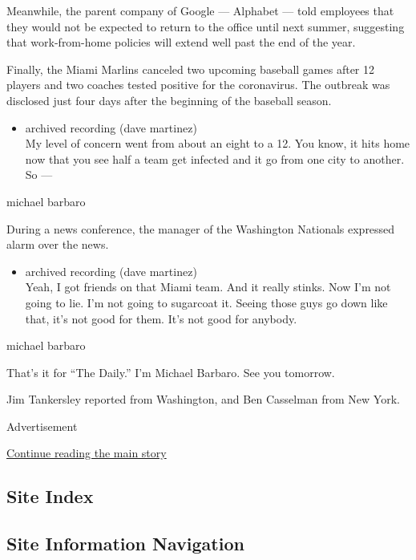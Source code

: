 Meanwhile, the parent company of Google --- Alphabet --- told employees
that they would not be expected to return to the office until next
summer, suggesting that work-from-home policies will extend well past
the end of the year.

Finally, the Miami Marlins canceled two upcoming baseball games after 12
players and two coaches tested positive for the coronavirus. The
outbreak was disclosed just four days after the beginning of the
baseball season.

\begin{itemize}
\tightlist
\item
  archived recording (dave martinez)\\
  My level of concern went from about an eight to a 12. You know, it
  hits home now that you see half a team get infected and it go from one
  city to another. So ---
\end{itemize}

michael barbaro

During a news conference, the manager of the Washington Nationals
expressed alarm over the news.

\begin{itemize}
\tightlist
\item
  archived recording (dave martinez)\\
  Yeah, I got friends on that Miami team. And it really stinks. Now I'm
  not going to lie. I'm not going to sugarcoat it. Seeing those guys go
  down like that, it's not good for them. It's not good for anybody.
\end{itemize}

michael barbaro

That's it for ``The Daily.'' I'm Michael Barbaro. See you tomorrow.

Jim Tankersley reported from Washington, and Ben Casselman from New
York.

Advertisement

\protect\hyperlink{after-bottom}{Continue reading the main story}

\hypertarget{site-index}{%
\subsection{Site Index}\label{site-index}}

\hypertarget{site-information-navigation}{%
\subsection{Site Information
Navigation}\label{site-information-navigation}}

